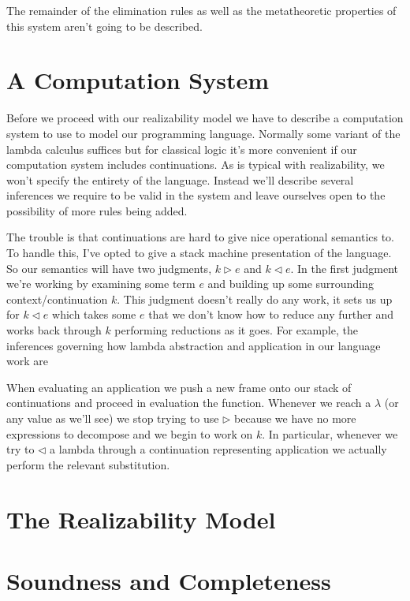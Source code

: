 \documentclass{amsart}
\newcommand{\push}{\rhd}
\newcommand{\pull}{\lhd}
\newcommand{\ap}[1]{\mathtt{ap}(-;\ #1)}
\begin{document}
The remainder of the elimination rules as well as the metatheoretic
properties of this system aren't going to be described.

\section{A Computation System}

Before we proceed with our realizability model we have to describe a
computation system to use to model our programming language. Normally
some variant of the lambda calculus suffices but for classical logic
it's more convenient if our computation system includes
continuations. As is typical with realizability, we
won't specify the entirety of the language. Instead we'll describe
several inferences we require to be valid in the system and leave
ourselves open to the possibility of more rules being added.

The trouble is that continuations are hard to give nice operational
semantics to. To handle this, I've opted to give a stack machine
presentation of the language. So our semantics will have two
judgments, $k \push e$ and $k \pull e$. In the first judgment we're
working by examining some term $e$ and building up some surrounding
context/continuation $k$. This judgment doesn't really do any work, it
sets us up for $k \pull e$ which takes some $e$ that we don't know how
to reduce any further and works back through $k$ performing reductions
as it goes. For example, the inferences governing how lambda
abstraction and application in our language work are


When evaluating an application we push a new frame onto our stack of
continuations and proceed in evaluation the function. Whenever we
reach a $\lambda$ (or any value as we'll see) we stop trying to use
$\push$ because we have no more expressions to decompose and we begin
to work on $k$. In particular, whenever we try to $\pull$ a lambda
through a continuation representing application we actually perform
the relevant substitution.

\section{The Realizability Model}

\section{Soundness and Completeness}
\end{document}
